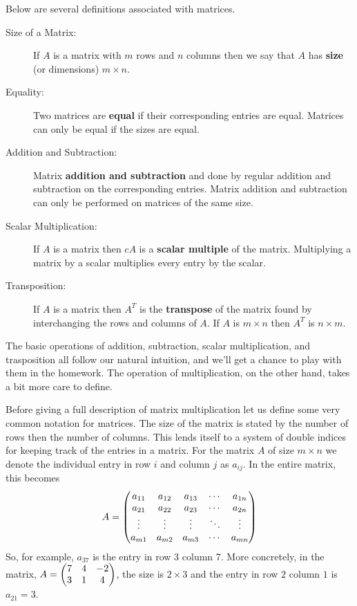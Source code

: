 \begin{definition} Below are several definitions associated with
    matrices.
    \begin{description}
        \item[Size of a Matrix:] If $A$ is a matrix with $m$ rows and $n$ columns then we
            say that $A$ has {\bf size} (or dimensions) $m \times n$.
        \item[Equality:] Two matrices are {\bf equal} if their corresponding entries are
            equal. Matrices can only be equal if the sizes are equal.
        \item[Addition and Subtraction:] Matrix {\bf addition and subtraction} and done by
            regular addition and subtraction on the corresponding entries.  Matrix
            addition and subtraction can only be performed on matrices of the same size.
        \item[Scalar Multiplication:] If $A$ is a matrix then $cA$ is a {\bf scalar
            multiple} of the matrix.  Multiplying a matrix by a scalar multiplies every
            entry by the scalar.
        \item[Transposition:] If $A$ is a matrix then $A^T$ is the {\bf transpose} of the
            matrix found by interchanging the rows and columns of $A$.  If $A$ is $m
            \times n$ then $A^T$ is $n \times m$.
    \end{description}
\end{definition}

The basic operations of addition, subtraction, scalar multiplication, and trasposition all
follow our natural intuition, and we'll get a chance to play with them in the homework.  The
operation of multiplication, on the other hand, takes a bit more care to define.

Before giving a full description of matrix multiplication let us define some very common
notation for matrices.  The size of the matrix is stated by the number of rows then the
number of columns.  This lends itself to a system of double indices for keeping track of
the entries in a matrix. For the matrix $A$ of
size $m \times n$ we denote the individual entry in row $i$ and column $j$ as $a_{ij}$.
In the entire matrix, this becomes
\[ A = \begin{pmatrix} a_{11} & a_{12} & a_{13} & \cdots & a_{1n} \\ 
    a_{21} & a_{22} & a_{23} & \cdots & a_{2n} \\
    \vdots & \vdots & \vdots & \ddots & \vdots \\
    a_{m1} & a_{m2} & a_{m3} & \cdots & a_{mn} \end{pmatrix} \]
So, for example, $a_{37}$ is the entry in row 3 column 7.  More concretely, in the matrix, $A = \begin{pmatrix} 7 & 4 & -2 \\ 3 & 1 & 4 \end{pmatrix}$,
the size is $2 \times 3$ and the entry in row $2$ column $1$ is $a_{21} = 3$.

